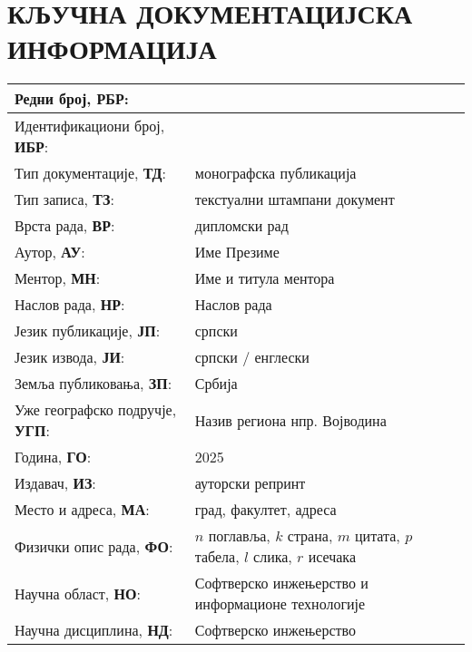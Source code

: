 \pagestyle{empty}

{
    \section*{\MakeUppercase{Кључна документацијска информација}}
    \small
    \begin{longtable}{| p{} | p{} |}
        \hline
        Редни број, \textbf{РБР}:                       & \\ \hline
        Идентификациони број, \textbf{ИБР}:             & \\ \hline
        Тип документације, \textbf{ТД}:                 & монографска публикација \\ \hline
        Тип записа, \textbf{ТЗ}:                        & текстуални штампани документ \\ \hline
        Врста рада, \textbf{ВР}:                        & дипломски рад \\ \hline
        Аутор, \textbf{АУ}:                             & Име Презиме \\ \hline
        Ментор, \textbf{МН}:                            & Име и титула ментора \\ \hline
        Наслов рада, \textbf{НР}:                       & Наслов рада \\ \hline
        Језик публикације, \textbf{ЈП}:                 & српски \\ \hline
        Језик извода, \textbf{ЈИ}:                      & српски / енглески \\ \hline
        Земља публиковања, \textbf{ЗП}:                 & Србија \\ \hline
        Уже географско подручје, \textbf{УГП}:          & Назив региона нпр. Војводина \\ \hline
        Година, \textbf{ГО}:                            & 2025 \\ \hline
        Издавач, \textbf{ИЗ}:                           & ауторски репринт \\ \hline
        Место и адреса, \textbf{МА}:                    & град, факултет, адреса \\ \hline
        Физички опис рада, \textbf{ФО}:                 & $n$ поглавља, $k$ страна, $m$ цитата, $p$ табела, $l$ слика, $r$ исечака \\ \hline
        Научна област, \textbf{НО}:                     & Софтверско инжењерство и информационе технологије  \\ \hline
        Научна дисциплина, \textbf{НД}:                 & Софтверско инжењерство \\ \hline

\end{longtable}}
